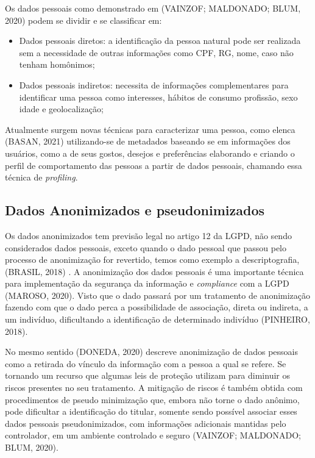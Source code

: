 \documentclass[
	12pt,				%
	openright,			%
	oneside,			%
	a4paper,			%
	english,			%
	french,				%
	spanish,			%
	brazil,				%
	]{abntex2}
\begin{document}
Os dados pessoais como demonstrado em (VAINZOF; MALDONADO; BLUM, 2020) podem se dividir e se classificar em:
\begin{itemize}
\item Dados pessoais diretos: a identificação da pessoa natural pode ser realizada sem a necessidade de outras informações como CPF, RG, nome, caso não tenham homônimos;
\item Dados pessoais indiretos: necessita de informações complementares para identificar uma pessoa como interesses, hábitos de consumo profissão, sexo idade e geolocalização;
\end{itemize}

Atualmente surgem novas técnicas para caracterizar uma pessoa, como elenca  (BASAN, 2021) utilizando-se de metadados baseando se em informações dos usuários, como a de seus gostos, desejos e preferências elaborando e criando o perfil de comportamento das pessoas a partir de dados pessoais, chamando essa técnica de \textit{profiling}.

\subsection{Dados Anonimizados e pseudonimizados}

Os dados anonimizados tem previsão legal no artigo 12 da LGPD, não sendo considerados dados pessoais, exceto quando o dado pessoal que passou pelo processo de anonimização for revertido, temos como exemplo a descriptografia,  (BRASIL, 2018) . A anonimização dos dados pessoais é uma importante técnica para implementação da segurança da informação e \textit{compliance} com a LGPD (MAROSO, 2020). Visto que o dado passará por um tratamento de anonimização fazendo com que o dado perca a possibilidade de associação, direta ou indireta, a um indivíduo, dificultando a identificação de determinado indivíduo  (PINHEIRO, 2018).

No mesmo sentido (DONEDA, 2020) descreve anonimização de dados pessoais como a retirada do vínculo da informação com a pessoa a qual se refere. Se tornando um recurso que algumas leis de proteção utilizam para diminuir os riscos presentes no seu tratamento. A mitigação de riscos é também obtida com procedimentos de pseudo minimização que, embora não torne o dado anônimo, pode dificultar a identificação do titular, somente sendo possível associar esses dados pessoais pseudonimizados, com informações adicionais mantidas pelo controlador, em um ambiente controlado e seguro (VAINZOF; MALDONADO; BLUM, 2020).
\end{document}
